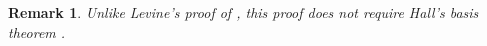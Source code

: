 \documentclass[11pt, a4paper, twoside,reqno]{amsart}
\newtheorem{rmq}[thm]{Remark}
\newtheorem{ex}[thm]{Example}
\begin{document}
\begin{rmq}\label{rmqpasinj}
Unlike Levine's proof of \cite[Proposition 6]{Levine4comp}, this proof does not require Hall’s basis theorem \cite[Theorem 11.2.4]{Mhall}. %
\end{rmq}

\end{document}
